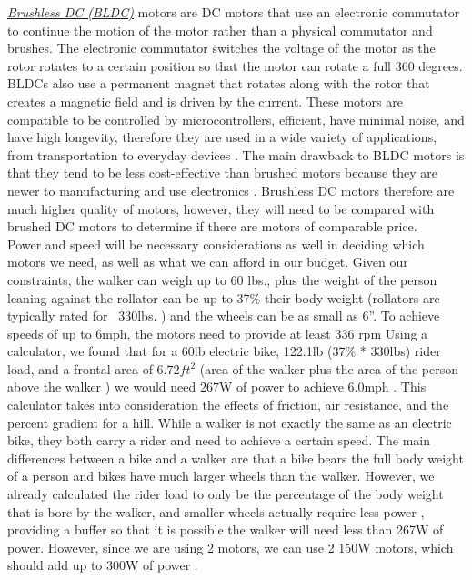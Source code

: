 \noindent \underline{\textit{Brushless DC (BLDC)}} motors are DC motors that use an electronic commutator to continue the motion of the motor rather than a physical commutator and brushes. The electronic commutator switches the voltage of the motor as the rotor rotates to a certain position so that the motor can rotate a full 360 degrees. BLDCs also use a permanent magnet that rotates along with the rotor that creates a magnetic field and is driven by the current. These motors are compatible to be controlled by microcontrollers, efficient, have minimal noise, and have high longevity, therefore they are used in a wide variety of applications, from transportation to everyday devices \cite{elprocus6}. The main drawback to BLDC motors is that they tend to be less cost-effective than brushed motors because they are newer to manufacturing and use electronics \cite{monolithicpower}. Brushless DC motors therefore are much higher quality of motors, however, they will need to be compared with brushed DC motors to determine if there are motors of comparable price. \\

\noindent Power and speed will be necessary considerations as well in deciding which motors we need, as well as what we can afford in our budget. Given our constraints, the walker can weigh up to 60 lbs., plus the weight of the person leaning against the rollator can be up to 37\% \cite{lee2019} their body weight (rollators are typically rated for ~330lbs. \cite{trionic}) and the wheels can be as small as 6”. To achieve speeds of up to 6mph, the motors need to provide at least 336 rpm \cite{spikevm} Using a calculator, we found that for a 60lb electric bike, 122.1lb (37\% * 330lbs) rider load, and a frontal area of $6.72ft^2$ (area of the walker plus the area of the person above the walker \cite{drive}\cite{xconvert}) we would need 267W of power to achieve 6.0mph \cite{gribble}. This calculator takes into consideration the effects of friction, air resistance, and the percent gradient for a hill. While a walker is not exactly the same as an electric bike, they both carry a rider and need to achieve a certain speed. The main differences between a bike and a walker are that a bike bears the full body weight of a person and bikes have much larger wheels than the walker. However, we already calculated the rider load to only be the percentage of the body weight that is bore by the walker, and smaller wheels actually require less power \cite{oxwheels}, providing a buffer so that it is possible the walker will need less than 267W of power. However, since we are using 2 motors, we can use 2 150W motors, which should add up to 300W of power \cite{ebikesforum}. \\